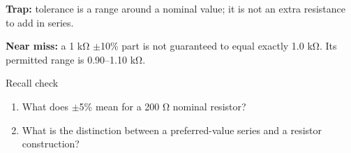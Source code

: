 \documentclass[11pt]{article}
\begin{document}
\begin{keepsection}
\begin{notebox}\textbf{Trap:} tolerance is a range around a nominal value; it is not an extra resistance to add in series.\end{notebox}

\begin{notebox}\textbf{Near miss:} a 1 kΩ \ensuremath{\pm}10\% part is not guaranteed to equal exactly 1.0 kΩ. Its permitted range is 0.90–1.10 kΩ.\end{notebox}

\begin{recallbox}{Recall check}
\begin{enumerate}
\item What does \ensuremath{\pm}5\% mean for a 200 Ω nominal resistor?
\item What is the distinction between a preferred-value series and a resistor construction?
\end{enumerate}

\end{recallbox}
\end{keepsection}
\end{document}
